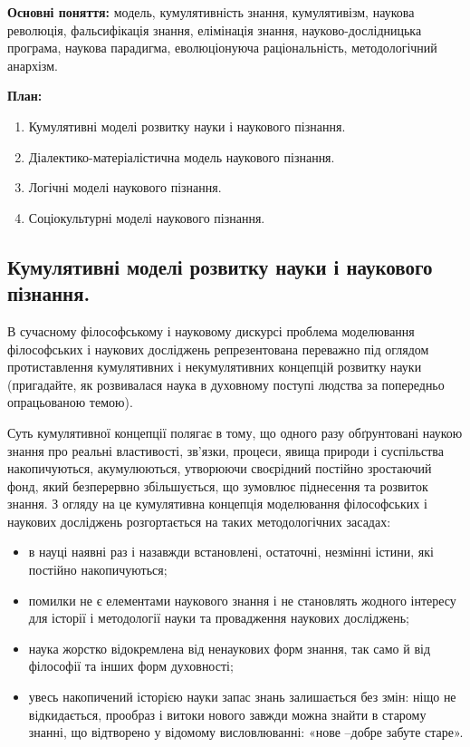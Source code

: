 \textbf{Основні поняття:} модель, кумулятивність знання, кумулятивізм, наукова
революція, фальсифікація знання, елімінація знання, науково-дослідницька
програма, наукова парадигма, еволюціонуюча раціональність, методологічний
анархізм.

\textbf{План:}
\begin{enumerate}
	\item Кумулятивні моделі розвитку науки і наукового пізнання.
	\item Діалектико-матеріалістична модель наукового пізнання.
	\item Логічні моделі наукового пізнання.
	\item Соціокультурні моделі наукового пізнання.
\end{enumerate}

\subsection{Кумулятивні моделі розвитку науки і наукового пізнання.} В
сучасному філософському і науковому дискурсі проблема моделювання
філософських і наукових досліджень репрезентована переважно під оглядом
протиставлення кумулятивних і некумулятивних концепцій розвитку науки
(пригадайте, як розвивалася наука в духовному поступі людства за попередньо
опрацьованою темою).

Суть кумулятивної концепції полягає в тому, що одного разу обґрунтовані
наукою знання про реальні властивості, зв’язки, процеси, явища природи і
суспільства накопичуються, акумулюються, утворюючи своєрідний постійно
зростаючий фонд, який безперервно збільшується, що зумовлює піднесення та
розвиток знання. З огляду на це кумулятивна концепція моделювання
філософських і наукових досліджень розгортається на таких методологічних
засадах:
\begin{itemize}
	\item в науці наявні раз і назавжди встановлені, остаточні, незмінні істини, які
	постійно накопичуються;

	\item помилки не є елементами наукового знання і не становлять жодного
	інтересу для історії і методології науки та провадження наукових досліджень;

	\item наука жорстко відокремлена від ненаукових форм знання, так само й від
	філософії та інших форм духовності;
	
	\item увесь накопичений історією науки запас знань залишається без змін: ніщо
	не відкидається, прообраз і витоки нового завжди можна знайти в старому
	знанні, що відтворено у відомому висловлюванні: «нове –добре забуте старе».
\end{itemize}

